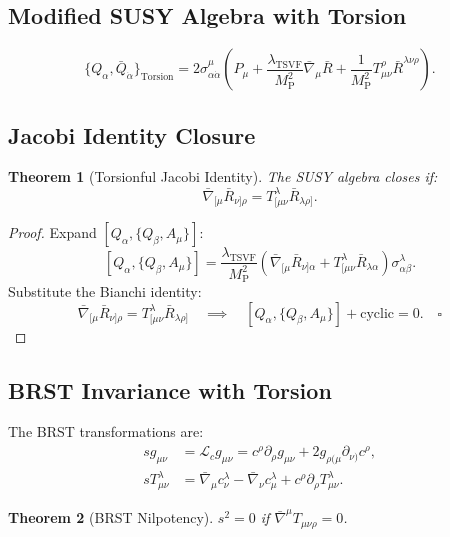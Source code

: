 \documentclass[12pt, onecolumn]{article}
\newtheorem{theorem}{Theorem}[section]
\newcommand{\TSVF}{\lambda_{\text{TSVF}}} %
\newcommand{\MP}{M_{\mathrm{P}}} %
\theoremstyle{definition}
\numberwithin{equation}{section}
\begin{document}
\begin{appendices}
\subsection{Modified SUSY Algebra with Torsion}\label{sec:susy-algebra}
\begin{equation}\label{eq:susy-torsion}
\{Q_\alpha, \bar{Q}_{\dot{\alpha}}\}_{\text{Torsion}} = 2\sigma^\mu_{\alpha\dot{\alpha}} \left( P_\mu + \frac{\TSVF}{\MP^2} \bar{\nabla}_\mu \bar{R} + \frac{1}{\MP^2} T^\rho_{\mu\nu} \bar{R}^{\lambda\nu\rho} \right).
\end{equation}

\subsection{Jacobi Identity Closure}\label{sec:jacobi}
\begin{theorem}[Torsionful Jacobi Identity]\label{thm:jacobi}
The SUSY algebra closes if:
\[
\bar{\nabla}_{[\mu} \bar{R}_{\nu]\rho} = T^\lambda_{[\mu\nu} \bar{R}_{\lambda\rho]}.
\]
\end{theorem}

\begin{proof}
Expand \( [Q_\alpha, \{Q_\beta, A_\mu\}] \):
\[
[Q_\alpha, \{Q_\beta, A_\mu\}] = \frac{\TSVF}{\MP^2} \left( \bar{\nabla}_{[\mu} \bar{R}_{\nu]\alpha} + T^\lambda_{[\mu\nu} \bar{R}_{\lambda\alpha} \right) \sigma^\lambda_{\alpha\beta}.
\]
Substitute the Bianchi identity:
\[
\bar{\nabla}_{[\mu} \bar{R}_{\nu]\rho} = T^\lambda_{[\mu\nu} \bar{R}_{\lambda\rho]} 
\quad \implies \quad 
[Q_\alpha, \{Q_\beta, A_\mu\}] + \text{cyclic} = 0. \quad \square
\]
\end{proof}

\subsection{BRST Invariance with Torsion}\label{sec:brst}
The BRST transformations are:
\begin{align}\label{eq:brst-trans}
s g_{\mu\nu} &= \mathcal{L}_c g_{\mu\nu} = c^\rho \partial_\rho g_{\mu\nu} + 2g_{\rho(\mu} \partial_{\nu)} c^\rho, \\[6pt]
s T^\lambda_{\mu\nu} &= \bar{\nabla}_\mu c^\lambda_\nu - \bar{\nabla}_\nu c^\lambda_\mu + c^\rho \partial_\rho T^\lambda_{\mu\nu}. \label{eq:brst-torsion}
\end{align}

\begin{theorem}[BRST Nilpotency]\label{thm:brst-nilpotency}
\( s^2 = 0 \) if \( \bar{\nabla}^\mu T_{\mu\nu\rho} = 0 \).
\end{theorem}


\end{appendices}
\end{document}

